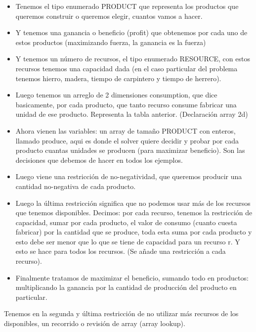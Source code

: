 \documentclass[12pt]{article}
\begin{document}
\begin{itemize}
\item Tenemos el tipo enumerado PRODUCT que representa los productos que queremos construir o queremos elegir, cuantos vamos a hacer.
\item Y tenemos una ganancia o beneficio (profit) que obtenemos por cada uno de estos productos (maximizando fuerza, la ganancia es la fuerza)
\item Y tenemos un número de recursos, el tipo enumerado RESOURCE, con estos recursos tenemos una capacidad dada (en el caso particular del problema tenemos hierro, madera, tiempo de carpintero y tiempo de herrero).
\item Luego tenemos un arreglo de 2 dimensiones consumption, que dice basicamente, por cada producto, que tanto recurso consume fabricar una unidad de ese producto. Representa la tabla anterior. (Declaración array 2d)
\item Ahora vienen las variables: un array de tamaño PRODUCT con enteros, llamado produce, aqui es donde el solver quiere decidir y probar por cada producto cuantas unidades se producen (para maximizar beneficio). Son las decisiones que debemos de hacer en todos los ejemplos. 
\item Luego viene una restricción de no-negatividad, que queremos producir una cantidad no-negativa de cada producto.
\item Luego la última restricción significa que no podemos usar más de los recursos que tenemos disponibles. Decimos: por cada recurso, tenemos la restricción de capacidad, sumar por cada producto, el valor de consumo (cuanto cuesta fabricar) por la cantidad que se produce, toda esta suma por cada producto y esto debe ser menor que lo que se tiene de capacidad para un recurso r. Y esto se hace para todos los recursos. (Se añade una restricción a cada recurso). 
\item Finalmente tratamos de maximizar el beneficio, sumando todo en productos: multiplicando la ganancia por la cantidad de producción del producto en particular. 
\end{itemize}

\begin{justify}
Tenemos en la segunda y última restricción de no utilizar más recursos de los disponibles, un recorrido o revisión de array (array lookup).
\end{justify}

\newpage
\end{document}
